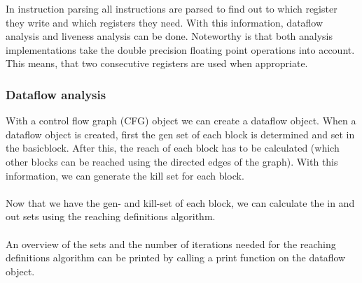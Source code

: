 In instruction parsing all instructions are parsed to find out to which
register they write and which registers they need. With this information,
dataflow analysis and liveness analysis can be done. Noteworthy is that both
analysis implementations take the double precision floating point 
operations into account. This means, that two consecutive registers are used when 
appropriate.
\subsubsection{Dataflow analysis}
With a control flow graph (CFG) object we can create a dataflow object. When a 
dataflow object is created, first the gen set of each block is determined and 
set in the basicblock. After this, the reach of each block has to be calculated
(which other blocks can be reached using the directed edges of the graph). With 
this information, we can generate the kill set for each block.\\
\\
Now that we have the gen- and kill-set of each block, we can calculate the
in and out sets using the reaching definitions algorithm.\\
\\
An overview of the sets and the number of iterations needed for the reaching 
definitions algorithm can be printed by calling a print function on the dataflow
object.
